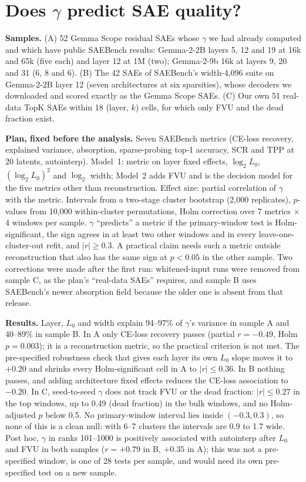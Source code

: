 \documentclass[10pt,twocolumn]{article}
\newcommand{\Lz}{L_0}
\begin{document}
\section{Does $\gamma$ predict SAE quality?}
\label{app:quality}

\textbf{Samples.} (A) 52 Gemma Scope residual SAEs whose $\gamma$ we had already computed and which have public SAEBench results: Gemma-2-2B layers 5, 12 and 19 at 16k and 65k (five each) and layer 12 at 1M (two); Gemma-2-9b 16k at layers 9, 20 and 31 (6, 8 and 6). (B) The 42 SAEs of SAEBench's width-4,096 suite on Gemma-2-2B layer 12 (seven architectures at six sparsities), whose decoders we downloaded and scored exactly as the Gemma Scope SAEs. (C) Our own 51 real-data TopK SAEs within 18 (layer, $k$) cells, for which only FVU and the dead fraction exist.

\textbf{Plan, fixed before the analysis.} Seven SAEBench metrics (CE-loss recovery, explained variance, absorption, sparse-probing top-1 accuracy, SCR and TPP at 20 latents, autointerp). Model~1: metric on layer fixed effects, $\log_2\Lz$, $(\log_2\Lz)^2$ and $\log_2$ width; Model~2 adds FVU and is the decision model for the five metrics other than reconstruction. Effect size: partial correlation of $\gamma$ with the metric. Intervals from a two-stage cluster bootstrap (2,000 replicates), $p$-values from 10,000 within-cluster permutations, Holm correction over 7 metrics $\times$ 4 windows per sample. $\gamma$ ``predicts'' a metric if the primary-window test is Holm-significant, the sign agrees in at least two other windows and in every leave-one-cluster-out refit, and $|r|\ge 0.3$. A practical claim needs such a metric outside reconstruction that also has the same sign at $p<0.05$ in the other sample. Two corrections were made after the first run: whitened-input runs were removed from sample C, as the plan's ``real-data SAEs'' requires, and sample B uses SAEBench's newer absorption field because the older one is absent from that release.

\textbf{Results.} Layer, $\Lz$ and width explain 94--97\% of $\gamma$'s variance in sample A and 40--89\% in sample B. In A only CE-loss recovery passes (partial $r=-0.49$, Holm $p=0.003$); it is a reconstruction metric, so the practical criterion is not met. The pre-specified robustness check that gives each layer its own $\Lz$ slope moves it to $+0.20$ and shrinks every Holm-significant cell in A to $|r|\le 0.36$. In B nothing passes, and adding architecture fixed effects reduces the CE-loss association to $-0.20$. In C, seed-to-seed $\gamma$ does not track FVU or the dead fraction: $|r|\le 0.27$ in the top windows, up to 0.49 (dead fraction) in the bulk windows, and no Holm-adjusted $p$ below 0.5. No primary-window interval lies inside $(-0.3, 0.3)$, so none of this is a clean null: with 6--7 clusters the intervals are 0.9 to 1.7 wide. Post hoc, $\gamma$ in ranks 101--1000 is positively associated with autointerp after $\Lz$ and FVU in both samples ($r=+0.79$ in B, $+0.35$ in A); this was not a pre-specified window, is one of 28 tests per sample, and would need its own pre-specified test on a new sample.
\end{document}
